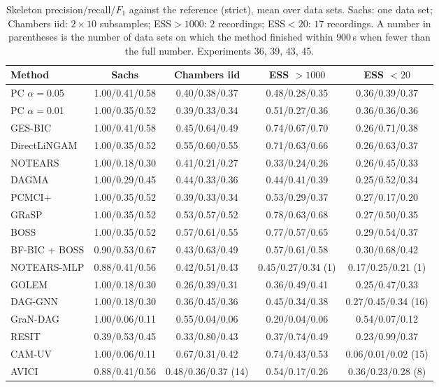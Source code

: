 \begin{table}[t]
\caption{Skeleton precision/recall/$F_1$ against the reference (strict), mean over data sets. Sachs: one data set; Chambers iid: $2\times10$ subsamples; ESS$>1000$: $2$ recordings; ESS$<20$: $17$ recordings. A number in parentheses is the number of data sets on which the method finished within $900$\,s when fewer than the full number. Experiments 36, 39, 43, 45.}
\label{tab:graphs}
\scriptsize
\setlength{\tabcolsep}{2pt}
\begin{tabular}{@{}lcccc@{}}
\toprule
Method & Sachs & Chambers iid & ESS $>1000$ & ESS $<20$\\
\midrule
PC $\alpha=$0.05 & 1.00/0.41/0.58 & 0.40/0.38/0.37 & 0.48/0.28/0.35 & 0.36/0.39/0.37\\
PC $\alpha=$0.01 & 1.00/0.35/0.52 & 0.39/0.33/0.34 & 0.51/0.27/0.36 & 0.36/0.36/0.36\\
GES-BIC & 1.00/0.41/0.58 & 0.45/0.64/0.49 & 0.74/0.67/0.70 & 0.26/0.71/0.38\\
DirectLiNGAM & 1.00/0.35/0.52 & 0.55/0.60/0.55 & 0.71/0.63/0.66 & 0.26/0.63/0.37\\
NOTEARS & 1.00/0.18/0.30 & 0.41/0.21/0.27 & 0.33/0.24/0.26 & 0.26/0.45/0.33\\
DAGMA & 1.00/0.29/0.45 & 0.44/0.33/0.36 & 0.44/0.41/0.39 & 0.25/0.52/0.34\\
PCMCI+ & 1.00/0.35/0.52 & 0.39/0.33/0.34 & 0.53/0.29/0.37 & 0.27/0.17/0.20\\
GRaSP & 1.00/0.35/0.52 & 0.53/0.57/0.52 & 0.78/0.63/0.68 & 0.27/0.50/0.35\\
BOSS & 1.00/0.35/0.52 & 0.57/0.61/0.55 & 0.77/0.57/0.65 & 0.29/0.54/0.37\\
BF-BIC + BOSS & 0.90/0.53/0.67 & 0.43/0.63/0.49 & 0.57/0.61/0.58 & 0.30/0.68/0.42\\
NOTEARS-MLP & 0.88/0.41/0.56 & 0.42/0.51/0.43 & 0.45/0.27/0.34 (1) & 0.17/0.25/0.21 (1)\\
GOLEM & 1.00/0.18/0.30 & 0.26/0.39/0.31 & 0.36/0.49/0.41 & 0.25/0.47/0.33\\
DAG-GNN & 1.00/0.18/0.30 & 0.36/0.45/0.36 & 0.45/0.34/0.38 & 0.27/0.45/0.34 (16)\\
GraN-DAG & 1.00/0.06/0.11 & 0.55/0.04/0.06 & 0.20/0.04/0.06 & 0.54/0.07/0.12\\
RESIT & 0.39/0.53/0.45 & 0.33/0.80/0.43 & 0.37/0.74/0.49 & 0.23/0.99/0.37\\
CAM-UV & 1.00/0.06/0.11 & 0.67/0.31/0.42 & 0.74/0.43/0.53 & 0.06/0.01/0.02 (15)\\
AVICI & 0.88/0.41/0.56 & 0.48/0.36/0.37 (14) & 0.54/0.17/0.26 & 0.36/0.23/0.28 (8)\\

\end{tabular}
\end{table}
